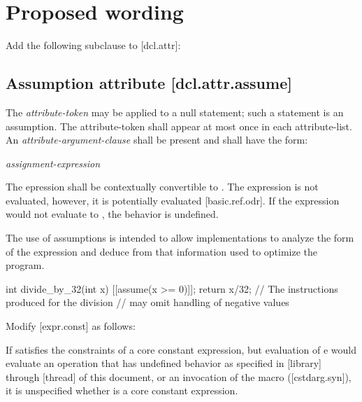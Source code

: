 \section{Proposed wording}

Add the following subclause to [dcl.attr]:

\begin{adjustwidth}{0.5cm}{0.5cm}
\begin{addedblock}
\subsection*{Assumption attribute \hspace{7.33cm} [dcl.attr.assume]}

The \textit{attribute-token}  may be applied to a null statement; such a statement is an assumption. The attribute-token  shall appear at most once in each attribute-list. An \textit{attribute-argument-clause} shall be present and shall have the form:

\hspace{5mm}\tcode{( }\textit{assignment-expression}\tcode{ )}

The epression shall be contextually convertible to . The expression is not evaluated, however, it is potentially evaluated [basic.ref.odr]. If the expression would not evaluate to , the behavior is undefined.


\begin{note}
The use of assumptions is intended to allow implementations to analyze the form of the expression and deduce from that information used to optimize the program.
\end{note}

\begin{example}
\begin{codeblock}
int divide_by_32(int x)  {
    [[assume(x >= 0)]];
    return x/32;   // The instructions produced for the division
                   //  may omit handling of negative values
}
\end{codeblock}
\end{example}
\end{addedblock}
\end{adjustwidth}

Modify [expr.const] as follows:

\begin{adjustwidth}{0.5cm}{0.5cm}
If  satisfies the constraints of a core constant expression, but evaluation of e would evaluate an operation that has undefined behavior as specified in [library] through [thread] of this document, or an invocation of the  macro ([cstdarg.syn]), it is unspecified whether  is a core constant expression.
\end{adjustwidth}

